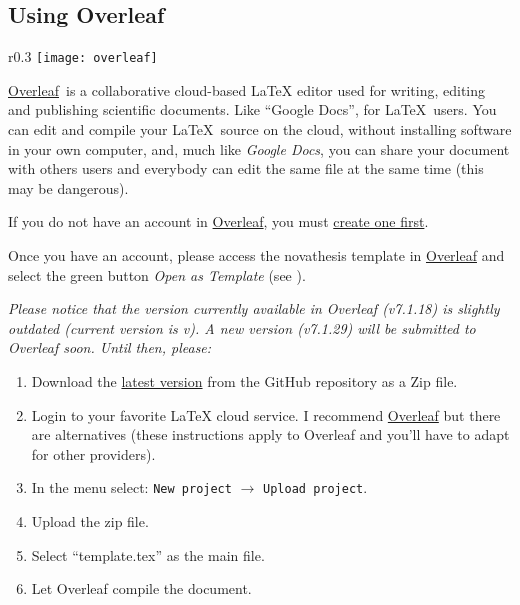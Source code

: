 \subsection{Using Overleaf}
\label{sub:using_overleaf}


\newcommand{\Overleaf}{\href{https://www.overleaf.com?r=f5160636&rm=d&rs=b}{Overleaf}}

\begin{wrapfigure}{r}{0.3\linewidth}
\texttt{[image: overleaf]}%
\caption{NOVAthesis template in Overleaf.}
\label{fig:overleaf}
\end{wrapfigure}
\mbox{}\Overleaf\ is a collaborative cloud-based LaTeX editor used for writing, editing and publishing scientific documents. Like “Google Docs”,  for \LaTeX\ users. You can edit and compile your \LaTeX\ source on the cloud, without installing software in your own computer, and, much like \emph{Google Docs}, you can share your document with others users and everybody can edit the same file at the same time (this may be dangerous).

If you do not have an account in \Overleaf, you must \href{https://www.overleaf.com?r=f5160636&rm=d&rs=b}{create one first}.

Once you have an account, please access the \gls{novathesis} template in \href{https://www.overleaf.com/latex/templates/novathesis-v7-dot-1-18/jhqwhtcwbmqc}{Overleaf} and select the green button \emph{Open as Template} (see ).

\bgroup
  \itshape
  Please notice that the version currently available in Overleaf (v7.1.18) is slightly outdated (current version is v\novathesisversion). A new version (v7.1.29) will be submitted to Overleaf soon.  Until then, please:
  \begin{enumerate}
    \item Download the \href{https://github.com/joaomlourenco/novathesis/archive/main.zip}{latest version} from the GitHub repository as a Zip file.
    \item Login to your favorite LaTeX cloud service. I recommend \href{https://www.overleaf.com/?r=f5160636&rm=d&rs=b}{Overleaf} but there are alternatives (these instructions apply to Overleaf and you'll have to adapt for other providers).
    \item In the menu select: \texttt{New project} $\rightarrow$ \texttt{Upload project}.
    \item Upload the zip file.
    \item Select “template.tex” as the main file.
    \item Let Overleaf compile the document.
  \end{enumerate}
\egroup

